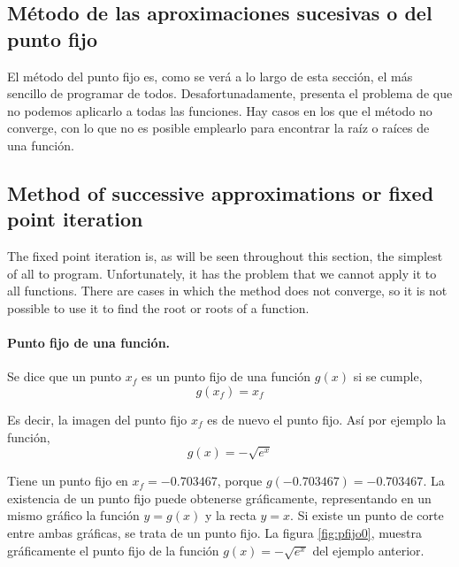 \begin{paracol}{2}




 \subsection{Método de las aproximaciones sucesivas o del punto fijo}\label{pfijo}

El método del punto fijo es, como se verá a lo largo de esta sección, el más sencillo de programar de todos. Desafortunadamente, presenta el problema de que no podemos aplicarlo a todas las funciones. Hay casos en los que el método no converge, con lo que no es posible emplearlo para encontrar la raíz o raíces de una función.
 \switchcolumn


\subsection{Method of successive approximations or fixed point iteration}\label{pfijo}

The fixed point iteration is, as will be seen throughout this section, the simplest of all to program. Unfortunately, it has the problem that we cannot apply it to all functions. There are cases in which the method does not converge, so it is not possible to use it to find the root or roots of a function.

\switchcolumn

\paragraph{Punto fijo de una función.} Se dice que un punto $x_f$ es un punto fijo de una función $g(x)$ si se cumple,
\begin{equation*}
g(x_f)=x_f
\end{equation*}

Es decir, la imagen del punto fijo $x_f$ es de nuevo el punto fijo. Así por ejemplo la función,
\begin{equation*}
g(x)=-\sqrt{e^x}
\end{equation*}

Tiene un punto fijo en $x_f=-0.703467$, porque $g(-0.703467)=-0.703467$. La existencia de un punto fijo puede obtenerse gráficamente, representando en un mismo gráfico la función $y=g(x)$ y la recta $y=x$. Si existe un punto de corte entre ambas gráficas, se trata de un punto fijo.  La figura \ref{fig:pfijo0}, muestra gráficamente el punto fijo de la función $g(x)=-\sqrt{e^x}$ del ejemplo anterior.


\end{paracol}
